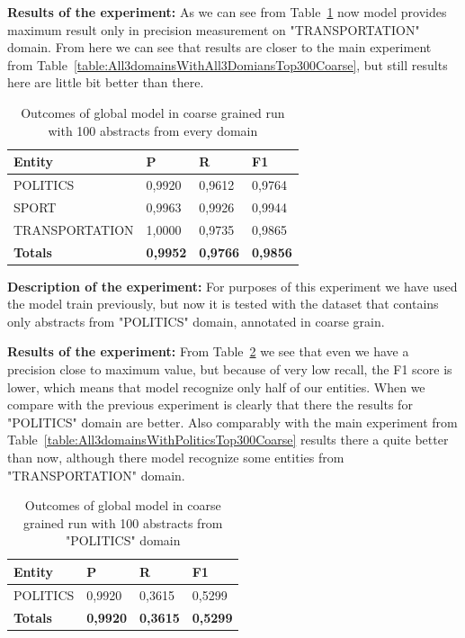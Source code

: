 \documentclass[thesis=M,english]{FITthesis}[2018/05/30]
\begin{document}
	\textbf{Results of the experiment:} As we can see from Table~\ref{table:100GlobalDomainWithAllAbstractsTop100Coarse} now model provides maximum result only in precision measurement on "TRANSPORTATION" domain. From here we can see that results are closer to the main experiment from Table~\ref{table:All3domainsWithAll3DomiansTop300Coarse}, but still results here are little bit better than there. 

	\begin{table}[H]\centering
		\begin{tabular}{|l|l|l|l|}
			\hline {\textbf{Entity}} & {\textbf{P}} & {\textbf{R}} & {\textbf{F1}}\\\hline
				POLITICS & 0,9920 & 0,9612 & 0,9764\\
				SPORT & 0,9963 & 0,9926 & 0,9944\\
				TRANSPORTATION & 1,0000 & 0,9735 & 0,9865\\\hline
				\textbf{Totals} & \textbf{0,9952} & \textbf{0,9766} & \textbf{0,9856}\\\hline
		\end{tabular}
		\caption{Outcomes of global model in coarse grained run with 100 abstracts from every domain \label{table:100GlobalDomainWithAllAbstractsTop100Coarse}}
	\end{table}


	\textbf{Description of the experiment:} For purposes of this experiment we have used the model train previously, but now it is tested with the dataset that contains only abstracts from "POLITICS" domain, annotated in coarse grain.

	\textbf{Results of the experiment:} From Table~\ref{table:100GlobalDomainWithPoliticsTop100Coarse} we see that even we have a precision close to maximum value, but because of very low recall, the F1 score is lower, which means that model recognize only half of our entities. When we compare with the previous experiment is clearly that there the results for "POLITICS" domain are better. Also comparably with the main experiment from Table~\ref{table:All3domainsWithPoliticsTop300Coarse} results there a quite better than now, although there model recognize some entities from "TRANSPORTATION" domain.

	\begin{table}[H]\centering
		\begin{tabular}{|l|l|l|l|}
			\hline {\textbf{Entity}} & {\textbf{P}} & {\textbf{R}} & {\textbf{F1}}\\\hline
				POLITICS & 0,9920 & 0,3615 & 0,5299\\\hline
				\textbf{Totals} & \textbf{0,9920} & \textbf{0,3615} & \textbf{0,5299}\\\hline
		\end{tabular}
		\caption{Outcomes of global model in coarse grained run with 100 abstracts from "POLITICS" domain \label{table:100GlobalDomainWithPoliticsTop100Coarse}}
	\end{table}
\end{document}
